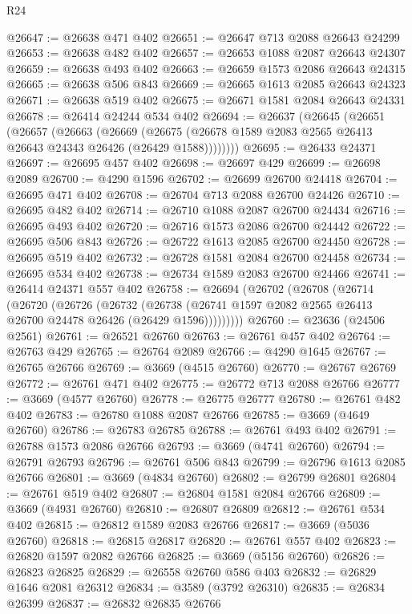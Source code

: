 \begin{lexlean}{R24}
\begin{coremodule}
@26647 := @26638 @471 @402
@26651 := @26647 @713 @2088 @26643 @24299
@26653 := @26638 @482 @402
@26657 := @26653 @1088 @2087 @26643 @24307
@26659 := @26638 @493 @402
@26663 := @26659 @1573 @2086 @26643 @24315
@26665 := @26638 @506 @843
@26669 := @26665 @1613 @2085 @26643 @24323
@26671 := @26638 @519 @402
@26675 := @26671 @1581 @2084 @26643 @24331
@26678 := @26414 @24244 @534 @402
@26694 := @26637
    (@26645
      (@26651
        (@26657
          (@26663
            (@26669
              (@26675 (@26678 @1589 @2083 @2565 @26413 @26643 @24343 @26426 (@26429 @1588))))))))
@26695 := @26433 @24371
@26697 := @26695 @457 @402
@26698 := @26697 @429
@26699 := @26698 @2089
@26700 := @4290 @1596
@26702 := @26699 @26700 @24418
@26704 := @26695 @471 @402
@26708 := @26704 @713 @2088 @26700 @24426
@26710 := @26695 @482 @402
@26714 := @26710 @1088 @2087 @26700 @24434
@26716 := @26695 @493 @402
@26720 := @26716 @1573 @2086 @26700 @24442
@26722 := @26695 @506 @843
@26726 := @26722 @1613 @2085 @26700 @24450
@26728 := @26695 @519 @402
@26732 := @26728 @1581 @2084 @26700 @24458
@26734 := @26695 @534 @402
@26738 := @26734 @1589 @2083 @26700 @24466
@26741 := @26414 @24371 @557 @402
@26758 := @26694
    (@26702
      (@26708
        (@26714
          (@26720
            (@26726
              (@26732
                (@26738 (@26741 @1597 @2082 @2565 @26413 @26700 @24478 @26426 (@26429 @1596)))))))))
@26760 := @23636 (@24506 @2561)
@26761 := @26521 @26760
@26763 := @26761 @457 @402
@26764 := @26763 @429
@26765 := @26764 @2089
@26766 := @4290 @1645
@26767 := @26765 @26766
@26769 := @3669 (@4515 @26760)
@26770 := @26767 @26769
@26772 := @26761 @471 @402
@26775 := @26772 @713 @2088 @26766
@26777 := @3669 (@4577 @26760)
@26778 := @26775 @26777
@26780 := @26761 @482 @402
@26783 := @26780 @1088 @2087 @26766
@26785 := @3669 (@4649 @26760)
@26786 := @26783 @26785
@26788 := @26761 @493 @402
@26791 := @26788 @1573 @2086 @26766
@26793 := @3669 (@4741 @26760)
@26794 := @26791 @26793
@26796 := @26761 @506 @843
@26799 := @26796 @1613 @2085 @26766
@26801 := @3669 (@4834 @26760)
@26802 := @26799 @26801
@26804 := @26761 @519 @402
@26807 := @26804 @1581 @2084 @26766
@26809 := @3669 (@4931 @26760)
@26810 := @26807 @26809
@26812 := @26761 @534 @402
@26815 := @26812 @1589 @2083 @26766
@26817 := @3669 (@5036 @26760)
@26818 := @26815 @26817
@26820 := @26761 @557 @402
@26823 := @26820 @1597 @2082 @26766
@26825 := @3669 (@5156 @26760)
@26826 := @26823 @26825
@26829 := @26558 @26760 @586 @403
@26832 := @26829 @1646 @2081 @26312
@26834 := @3589 (@3792 @26310)
@26835 := @26834 @26399
@26837 := @26832 @26835 @26766

\end{coremodule}
\end{lexlean}

